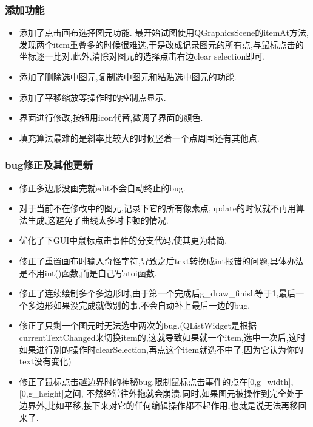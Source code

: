 \documentclass[a4paper,UTF8]{article}
\theoremstyle{definition}
\begin{document}
\subsubsection{添加功能}
\begin{itemize}
\item 添加了点击画布选择图元功能. 最开始试图使用QGraphicsScene的itemAt方法,发现两个item重叠多的时候很难选,于是改成记录图元的所有点,与鼠标点击的坐标逐一比对.此外,清除对图元的选择点击右边clear selection即可.
\item 添加了删除选中图元,复制选中图元和粘贴选中图元的功能.
\item 添加了平移缩放等操作时的控制点显示.
\item 界面进行修改,按钮用icon代替,微调了界面的颜色.
\item 填充算法最难的是斜率比较大的时候竖着一个点周围还有其他点.
\end{itemize}
\subsubsection{bug修正及其他更新}
\begin{itemize}
\item 修正多边形没画完就edit不会自动终止的bug.
\item 对于当前不在修改中的图元,记录下它的所有像素点,update的时候就不再用算法生成,这避免了曲线太多时卡顿的情况.
\item 优化了下GUI中鼠标点击事件的分支代码,使其更为精简.
\item 修正了重置画布时输入奇怪字符,导致之后text转换成int报错的问题,具体办法是不用int()函数,而是自己写atoi函数.
\item 修正了连续绘制多个多边形时,由于第一个完成后g\_draw\_finish等于1,最后一个多边形如果没完成就做别的事,不会自动补上最后一边的bug.
\item 修正了只剩一个图元时无法选中两次的bug.(QListWidget是根据currentTextChanged来切换item的,这就导致如果就一个item,选中一次后,这时如果进行别的操作时clearSelection,再点这个item就选不中了,因为它认为你的text没有变化)
\item 修正了鼠标点击越边界时的神秘bug.限制鼠标点击事件的点在[0,g\_width], [0,g\_height]之间, 不然经常往外拖就会崩溃.同时,如果图元被操作到完全处于边界外,比如平移,接下来对它的任何编辑操作都不起作用,也就是说无法再移回来了.
\end{itemize}
%

\end{document}
